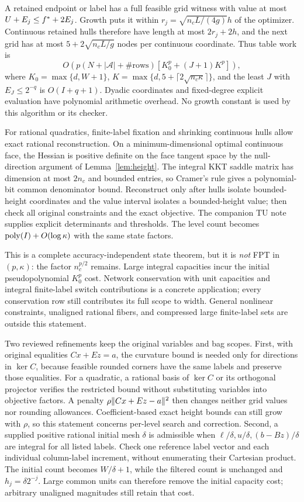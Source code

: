 A retained endpoint or label has a full feasible grid witness with
value at most $U+E_j\le f^*+2E_j$. Growth puts it within
$r_j=\sqrt{n_cL/(4g)}h$ of the optimizer. Continuous retained hulls
therefore have length at most $2r_j+2h$, and the next grid has at most
$5+2\sqrt{n_cL/g}$ nodes per continuous coordinate. Thus table work is
\begin{equation}\label{eq:tucost}
O\!\left(p(N+|\mathcal A|+\#\mathrm{rows})
 [K_0^p+(J+1)K^p]\right),
\end{equation}
where $K_0=\max\{d,W+1\}$,
$K=\max\{d,5+\lceil2\sqrt{n_c\kappa}\rceil\}$, and the least
$J$ with $E_J\le2^{-q}$ is $O(I+q+1)$. Dyadic coordinates and
fixed-degree explicit evaluation have polynomial arithmetic overhead.
No growth constant is used by this algorithm or its checker.

For rational quadratics, finite-label fixation and shrinking continuous
hulls allow exact rational reconstruction. On a minimum-dimensional
optimal continuous face, the Hessian is positive definite on the face
tangent space by the null-direction argument of Lemma~\ref{lem:height}.
The integral KKT saddle matrix has dimension at most $2n_c$ and bounded
entries, so Cramer's rule gives a polynomial-bit common denominator
bound. Reconstruct only after hulls isolate bounded-height coordinates
and the value interval isolates a bounded-height value; then check all
original constraints and the exact objective. The companion TU note
supplies explicit determinants and thresholds. The level count becomes
$\operatorname{poly}(I)+O(\log\kappa)$ with the same state factors.

This is a complete accuracy-independent state theorem, but it is
\emph{not} FPT in $(p,\kappa)$: the factor $n_c^{p/2}$ remains.
Large integral capacities incur the initial pseudopolynomial $K_0^p$
cost. Network conservation with unit capacities and integral finite-label
switch contributions is a concrete application; every conservation row
still contributes its full scope to width. General nonlinear constraints,
unaligned rational fibers, and compressed large finite-label sets are
outside this statement.

Two reviewed refinements keep the original variables and bag scopes.
First, with original equalities $Cx+Ez=a$, the curvature bound is needed
only for directions in $\ker C$, because feasible rounded corners have
the same labels and preserve those equalities. For a quadratic, a rational
basis of $\ker C$ or its orthogonal projector verifies the restricted
bound without substituting variables into objective factors. A penalty
$\rho\lVert Cx+Ez-a\rVert^2$ then changes neither grid values nor rounding
allowances. Coefficient-based exact height bounds can still grow with
$\rho$, so this statement concerns per-level search and correction.
Second, a supplied positive rational initial mesh $\delta$ is admissible
when $\ell/\delta,u/\delta,(b-Bz)/\delta$ are integral for all listed
labels. Check one reference label vector and each individual column-label
increment, without enumerating their Cartesian product. The initial
count becomes $W/\delta+1$, while the filtered count is unchanged and
$h_j=\delta2^{-j}$. Large common units can therefore remove the initial
capacity cost; arbitrary unaligned magnitudes still retain that cost.

